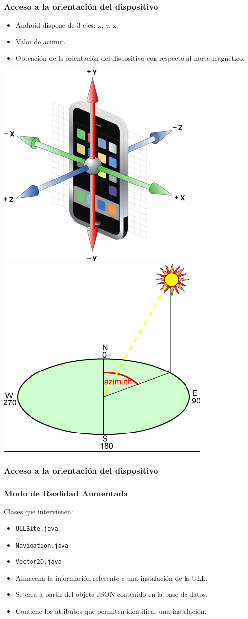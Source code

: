 \begin{frame}
	\frametitle{Acceso a la orientación del dispositivo}
			\begin{itemize}
				\item Android dispone de 3 ejes: x, y, z.
				\item Valor de acimut.
				\item Obtención de la orientación del dispositivo con respecto al norte magnético.
			\end{itemize}
		\endblock{}

		\begin{center} 
			\hspace*{0.5in}
			\includegraphics[width=0.3\linewidth]{Images/xyz}
			\hfill
			\includegraphics[width=0.3\linewidth]{Images/acimut}
			\hspace*{0.5in}
		\end{center}
\end{frame}		
		

\begin{frame}
	\frametitle{Acceso a la orientación del dispositivo}
	
\end{frame}


\begin{frame}
	\frametitle{Modo de Realidad Aumentada}
			Clases que intervienen:
			\begin{itemize}
				\item \texttt{ULLSite.java}
				\item \texttt{Navigation.java}
				\item \texttt{Vector2D.java}
			\end{itemize}
			\endblock{}

			\begin{itemize}
				\item Almacena la información referente a una instalación de la ULL.
				\item Se crea a partir del objeto JSON contenido en la base de datos.
				\item Contiene los atributos que permiten identificar una instalación.
			\end{itemize}
			\endblock{}

\end{frame}
 
